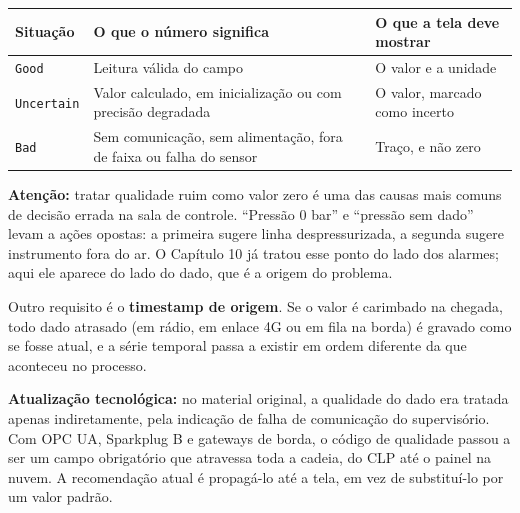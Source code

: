 \begin{longtable}[]{@{}
  >{\raggedright\arraybackslash}p{}
  >{\raggedright\arraybackslash}p{}
  >{\raggedright\arraybackslash}p{}@{}}
\toprule\noalign{}
\begin{minipage}[b]{\linewidth}\raggedright
Situação
\end{minipage} & \begin{minipage}[b]{\linewidth}\raggedright
O que o número significa
\end{minipage} & \begin{minipage}[b]{\linewidth}\raggedright
O que a tela deve mostrar
\end{minipage} \\
\midrule\noalign{}
\endhead
\bottomrule\noalign{}
\endlastfoot
\passthrough{\lstinline!Good!} & Leitura válida do campo & O valor e a unidade \\
\passthrough{\lstinline!Uncertain!} & Valor calculado, em inicialização ou com precisão degradada & O valor, marcado como incerto \\
\passthrough{\lstinline!Bad!} & Sem comunicação, sem alimentação, fora de faixa ou falha do sensor & Traço, e não zero \\
\end{longtable}

\begin{caixaatencao}

\textbf{Atenção:} tratar qualidade ruim como valor zero é uma das causas mais comuns de decisão
errada na sala de controle. ``Pressão 0 bar'' e ``pressão sem dado'' levam a ações opostas: a primeira
sugere linha despressurizada, a segunda sugere instrumento fora do ar. O Capítulo 10 já tratou esse
ponto do lado dos alarmes; aqui ele aparece do lado do dado, que é a origem do problema.

\end{caixaatencao}

Outro requisito é o \textbf{timestamp de origem}. Se o valor é carimbado na chegada, todo dado atrasado
(em rádio, em enlace 4G ou em fila na borda) é gravado como se fosse atual, e a série temporal passa
a existir em ordem diferente da que aconteceu no processo.

\begin{caixanota}

\textbf{Atualização tecnológica:} no material original, a qualidade do dado era tratada apenas
indiretamente, pela indicação de falha de comunicação do supervisório. Com OPC UA, Sparkplug B e
gateways de borda, o código de qualidade passou a ser um campo obrigatório que atravessa toda a
cadeia, do CLP até o painel na nuvem. A recomendação atual é propagá-lo até a tela, em vez de
substituí-lo por um valor padrão.

\end{caixanota}

